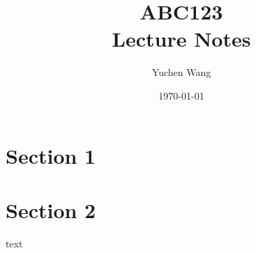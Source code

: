 \documentclass[11pt]{article}
\title{ABC123\\ Lecture Notes}
\author{Yuchen Wang}
\date{\today}
\begin{document}
    \maketitle
    \tableofcontents
    \newpage

\section{Section 1}
\section{Section 2}

text
\end{document}
